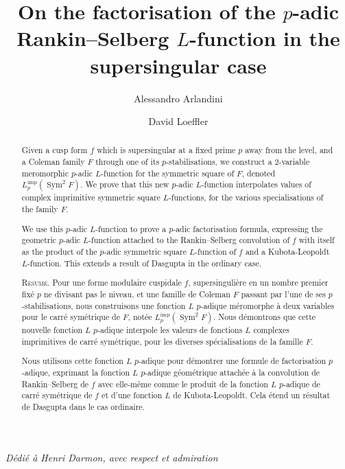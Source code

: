 \documentclass[11pt, a4paper, reqno]{amsart}
\author{Alessandro Arlandini}
\author{David Loeffler}
\title{On the factorisation of the \texorpdfstring{$p$}{p}-adic Rankin--Selberg \texorpdfstring{$L$}{L}-function in the supersingular case}
\theoremstyle{definition}
\theoremstyle{plain}
\theoremstyle{remark}
\DeclareMathOperator{\Sym}{Sym}
\newcommand{\Limp}{L^{\mathrm{imp}}}
\begin{document}

\begin{abstract}
Given a cusp form $f$ which is supersingular at a fixed prime $p$ away from the level, and a Coleman family $F$ through one of its $p$-stabilisations, we construct a $2$-variable meromorphic $p$-adic $L$-function for the symmetric square of $F$, denoted $\Limp_p(\Sym^2 F)$. We prove that this new $p$-adic $L$-function interpolates values of complex imprimitive symmetric square $L$-functions, for the various specialisations of the family $F$.

We use this $p$-adic $L$-function to prove a $p$-adic factorisation formula, expressing the geometric $p$-adic $L$-function attached to the Rankin--Selberg convolution of $f$ with itself as the product of the $p$-adic symmetric square $L$-function of $f$ and a Kubota-Leopoldt $L$-function. This extends a result of Dasgupta in the ordinary case.

\bigskip

\noindent\textsc{R\'esum\'e.}
Pour une forme modulaire cuspidale \(f\), supersingulière en un nombre premier fixé \(p\) ne divisant pas le niveau, et une famille de Coleman \(F\) passant par l’une de ses \(p\)-stabilisations, nous construisons une fonction \(L\) \(p\)-adique méromorphe à deux variables pour le carré symétrique de \(F\), notée \(\Limp_p(\Sym^2 F)\). Nous démontrons que cette nouvelle fonction \(L\) \(p\)-adique interpole les valeurs de fonctions \(L\) complexes imprimitives de carré symétrique, pour les diverses spécialisations de la famille \(F\).

Nous utilisons cette fonction \(L\) \(p\)-adique pour démontrer une formule de factorisation \(p\)-adique, exprimant la fonction \(L\) \(p\)-adique géométrique attachée à la convolution de Rankin--Selberg de \(f\) avec elle-même comme le produit de la fonction \(L\) \(p\)-adique de carré symétrique de \(f\) et d’une fonction \(L\) de Kubota-Leopoldt. Cela étend un résultat de Dasgupta dans le cas ordinaire.
\end{abstract}
\maketitle

\centerline{\emph{D\'edi\'e \`a Henri Darmon, avec respect et admiration}}

\setcounter{tocdepth}{1}
\tableofcontents
{}
\end{document}
